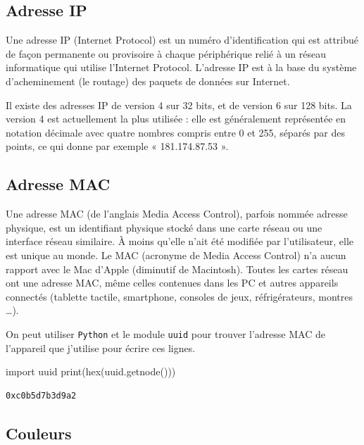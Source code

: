 \documentclass[
  letterpaper,
]{scrbook}
\newenvironment{Shaded}{}{}
\newcommand{\BuiltInTok}[1]{#1}
\newcommand{\ImportTok}[1]{#1}
\newcommand{\NormalTok}[1]{#1}
\theoremstyle{plain}
\theoremstyle{definition}
\theoremstyle{definition}
\theoremstyle{remark}
\begin{document}
\hypertarget{adresse-ip}{%
\subsection{Adresse IP}\label{adresse-ip}}

Une adresse IP (Internet Protocol) est un numéro d'identification qui
est attribué de façon permanente ou provisoire à chaque périphérique
relié à un réseau informatique qui utilise l'Internet Protocol.
L'adresse IP est à la base du système d'acheminement (le routage) des
paquets de données sur Internet.

Il existe des adresses IP de version 4 sur 32 bits, et de version 6 sur
128 bits. La version 4 est actuellement la plus utilisée : elle est
généralement représentée en notation décimale avec quatre nombres
compris entre 0 et 255, séparés par des points, ce qui donne par exemple
« 181.174.87.53 ».

\hypertarget{adresse-mac}{%
\subsection{Adresse MAC}\label{adresse-mac}}

Une adresse MAC (de l'anglais Media Access Control), parfois nommée
adresse physique, est un identifiant physique stocké dans une carte
réseau ou une interface réseau similaire. À moins qu'elle n'ait été
modifiée par l'utilisateur, elle est unique au monde. Le MAC (acronyme
de Media Access Control) n'a aucun rapport avec le Mac d'Apple
(diminutif de Macintosh). Toutes les cartes réseau ont une adresse MAC,
même celles contenues dans les PC et autres appareils connectés
(tablette tactile, smartphone, consoles de jeux, réfrigérateurs, montres
\ldots).

On peut utiliser \texttt{Python} et le module \texttt{uuid} pour trouver
l'adresse MAC de l'appareil que j'utilise pour écrire ces lignes.

\begin{Shaded}
\begin{Highlighting}[]
\ImportTok{import}\NormalTok{ uuid}
\BuiltInTok{print}\NormalTok{(}\BuiltInTok{hex}\NormalTok{(uuid.getnode()))}
\end{Highlighting}
\end{Shaded}

\begin{verbatim}
0xc0b5d7b3d9a2
\end{verbatim}

\hypertarget{couleurs}{%
\subsection{Couleurs}\label{couleurs}}
\end{document}
